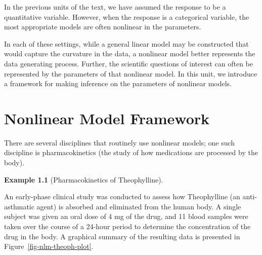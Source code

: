 \documentclass[
  letterpaper,
  DIV=11,
  numbers=noendperiod]{scrreprt}
\theoremstyle{definition}
\theoremstyle{definition}
\newtheorem{example}{Example}[chapter]
\theoremstyle{remark}
\begin{document}
In the previous units of the text, we have assumed the response to be a
quantitative variable. However, when the response is a categorical
variable, the most appropriate models are often nonlinear in the
parameters.

In each of these settings, while a general linear model may be
constructed that would capture the curvature in the data, a nonlinear
model better represents the data generating process. Further, the
scientific questions of interest can often be represented by the
parameters of that nonlinear model. In this unit, we introduce a
framework for making inference on the parameters of nonlinear models.

\hypertarget{sec-nlm-model-framework}{%
\chapter{Nonlinear Model Framework}\label{sec-nlm-model-framework}}

\providecommand{\norm}[1]{\left\lVert#1\right\rVert}
\providecommand{\abs}[1]{\left\lvert#1\right\rvert}
\providecommand{\dist}[1]{\stackrel{\text{#1}}{\sim}}
\providecommand{\ind}[1]{\mathbb{I}\left(#1\right)}
\providecommand{\bm}[1]{\mathbf{#1}}
\providecommand{\bs}[1]{\boldsymbol{#1}}
\providecommand{\Ell}{\mathcal{L}}
\providecommand{\indep}{\perp\negthickspace\negmedspace\perp}

There are several disciplines that routinely use nonlinear models; one
such discipline is pharmacokinetics (the study of how medications are
processed by the body).

\begin{example}[Pharmacokinetics of
Theophylline]\protect\hypertarget{exm-nlm-theoph}{}\label{exm-nlm-theoph}

An early-phase clinical study was conducted to assess how Theophylline
(an anti-asthmatic agent) is absorbed and eliminated from the human
body. A single subject was given an oral dose of 4 mg of the drug, and
11 blood samples were taken over the course of a 24-hour period to
determine the concentration of the drug in the body. A graphical summary
of the resulting data is presented in Figure~\ref{fig-nlm-theoph-plot}.

\end{example}
\end{document}
